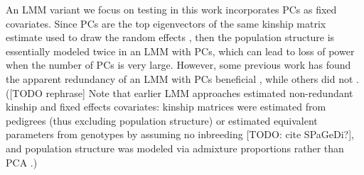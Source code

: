 \documentclass[11pt]{article}
\begin{document}
An LMM variant we focus on testing in this work incorporates PCs as fixed covariates.
Since PCs are the top eigenvectors of the same kinship matrix estimate used to draw the random effects \citep{astle_population_2009, hoffman_correcting_2013}, then the population structure is essentially modeled twice in an LMM with PCs, which can lead to loss of power when the number of PCs is very large.
However, some previous work has found the apparent redundancy of an LMM with PCs beneficial \citep{price_new_2010, tucker_improving_2014}, while others did not \citep{liu_controlling_2011}.
([TODO rephrase] Note that earlier LMM approaches estimated non-redundant kinship and fixed effects covariates: kinship matrices were estimated from pedigrees (thus excluding population structure) or estimated equivalent parameters from genotypes by assuming no inbreeding [TODO: cite SPaGeDi?], and population structure was modeled via admixture proportions rather than PCA \citep{yu_unified_2006, zhao_arabidopsis_2007}.)
\end{document}
